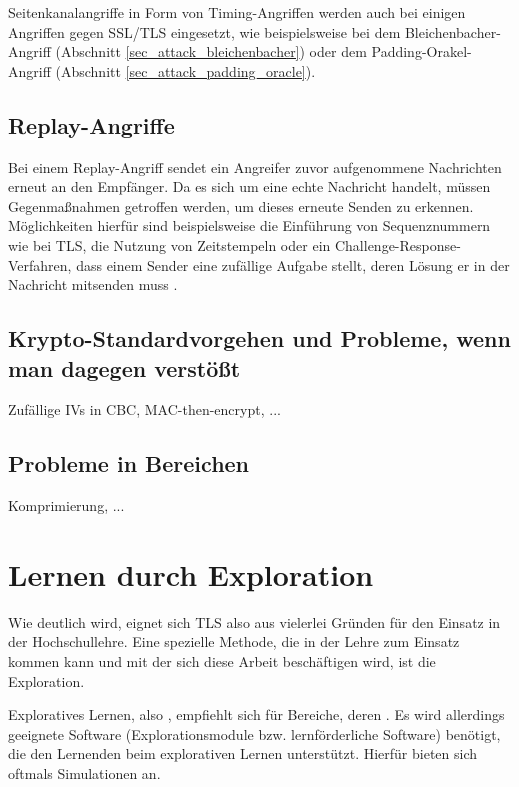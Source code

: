Seitenkanalangriffe in Form von Timing-Angriffen werden auch bei einigen Angriffen gegen SSL/TLS eingesetzt, wie beispielsweise bei dem Bleichenbacher-Angriff (Abschnitt \ref{sec_attack_bleichenbacher}) oder dem Padding-Orakel-Angriff (Abschnitt \ref{sec_attack_padding_oracle}).

\subsection{Replay-Angriffe}

Bei einem Replay-Angriff sendet ein Angreifer zuvor aufgenommene Nachrichten erneut an den Empfänger. Da es sich um eine echte Nachricht handelt, müssen Gegenmaßnahmen getroffen werden, um dieses erneute Senden zu erkennen. Möglichkeiten hierfür sind beispielsweise die Einführung von Sequenznummern wie bei TLS, die Nutzung von Zeitstempeln oder ein Challenge-Response-Verfahren, dass einem Sender eine zufällige Aufgabe stellt, deren Lösung er in der Nachricht mitsenden muss \cite{ferguson10}.

\subsection{Krypto-Standardvorgehen und Probleme, wenn man dagegen verstößt}
Zufällige IVs in CBC, MAC-then-encrypt, ...

\subsection{Probleme in  Bereichen}
Komprimierung, ...

\section{Lernen durch Exploration}
\label{sec_exploration}

Wie deutlich wird, eignet sich TLS also aus vielerlei Gründen für den Einsatz in der Hochschullehre. Eine spezielle Methode, die in der Lehre zum Einsatz kommen kann und mit der sich diese Arbeit beschäftigen wird, ist die Exploration.

Exploratives Lernen, also , empfiehlt sich für Bereiche, deren  \cite{schubert11}. 
Es wird allerdings geeignete Software (Explorationsmodule bzw. lernförderliche Software) benötigt, die den Lernenden beim explorativen Lernen unterstützt. Hierfür bieten sich oftmals Simulationen an. 

